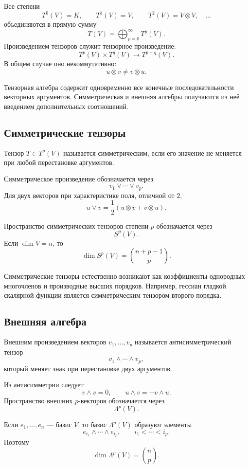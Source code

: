 Все степени
\[
T^0(V)=K,\qquad
T^1(V)=V,\qquad
T^2(V)=V\otimes V,\quad\dots
\]
объединяются в прямую сумму
\[
T(V)=
\bigoplus_{p=0}^{\infty}T^p(V).
\]
Произведением тензоров служит тензорное произведение:
\[
T^p(V)\times T^q(V)\to T^{p+q}(V).
\]
В общем случае оно некоммутативно:
\[
u\otimes v\neq v\otimes u.
\]

Тензорная алгебра содержит одновременно все конечные последовательности векторных аргументов. Симметрическая и внешняя алгебры получаются из неё введением дополнительных соотношений.

\subsection{Симметрические тензоры}

\begin{definition}
Тензор \(T\in T^p(V)\) называется симметрическим, если его значение не меняется при любой перестановке аргументов.
\end{definition}

Симметрическое произведение обозначается через
\[
v_1\vee\cdots\vee v_p.
\]
Для двух векторов при характеристике поля, отличной от \(2\),
\[
u\vee v
=
\frac12(u\otimes v+v\otimes u).
\]

Пространство симметрических тензоров степени \(p\) обозначается через
\[
S^p(V).
\]
Если \(\dim V=n\), то
\[
\dim S^p(V)
=
\binom{n+p-1}{p}.
\]

Симметрические тензоры естественно возникают как коэффициенты однородных многочленов и производные высших порядков. Например, гессиан гладкой скалярной функции является симметрическим тензором второго порядка.

\subsection{Внешняя алгебра}

\begin{definition}
Внешним произведением векторов \(v_1,\dots,v_p\) называется антисимметрический тензор
\[
v_1\wedge\cdots\wedge v_p,
\]
который меняет знак при перестановке двух аргументов.
\end{definition}

Из антисимметрии следует
\[
v\wedge v=0,
\qquad
u\wedge v=-v\wedge u.
\]
Пространство внешних \(p\)-векторов обозначается через
\[
\Lambda^p(V).
\]

Если \(e_1,\dots,e_n\) --- базис \(V\), то базис \(\Lambda^p(V)\) образуют элементы
\[
e_{i_1}\wedge\cdots\wedge e_{i_p},
\qquad
i_1<\cdots<i_p.
\]
Поэтому
\[
\dim\Lambda^p(V)=\binom{n}{p}.
\]

